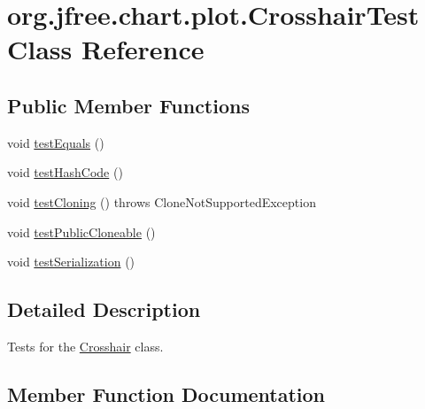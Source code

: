 \hypertarget{classorg_1_1jfree_1_1chart_1_1plot_1_1_crosshair_test}{}\section{org.\+jfree.\+chart.\+plot.\+Crosshair\+Test Class Reference}
\label{classorg_1_1jfree_1_1chart_1_1plot_1_1_crosshair_test}
\subsection*{Public Member Functions}
\begin{DoxyCompactItemize}
\item 
void \mbox{\hyperlink{classorg_1_1jfree_1_1chart_1_1plot_1_1_crosshair_test_ab77c3b798ca7873407dafb62c32d7858}{test\+Equals}} ()
\item 
void \mbox{\hyperlink{classorg_1_1jfree_1_1chart_1_1plot_1_1_crosshair_test_af43d61dabaaa6a0affbe99363fb462ba}{test\+Hash\+Code}} ()
\item 
void \mbox{\hyperlink{classorg_1_1jfree_1_1chart_1_1plot_1_1_crosshair_test_a7f64f723df34e7feadcafbcbbe968119}{test\+Cloning}} ()  throws Clone\+Not\+Supported\+Exception 
\item 
void \mbox{\hyperlink{classorg_1_1jfree_1_1chart_1_1plot_1_1_crosshair_test_a7941568a94230841159eade0da0b4ff3}{test\+Public\+Cloneable}} ()
\item 
void \mbox{\hyperlink{classorg_1_1jfree_1_1chart_1_1plot_1_1_crosshair_test_aa229fbb9d51bfe6057292f36ec997e7c}{test\+Serialization}} ()
\end{DoxyCompactItemize}


\subsection{Detailed Description}
Tests for the \mbox{\hyperlink{classorg_1_1jfree_1_1chart_1_1plot_1_1_crosshair}{Crosshair}} class. 

\subsection{Member Function Documentation}
\mbox{\label{classorg_1_1jfree_1_1chart_1_1plot_1_1_crosshair_test_a7f64f723df34e7feadcafbcbbe968119}} 
